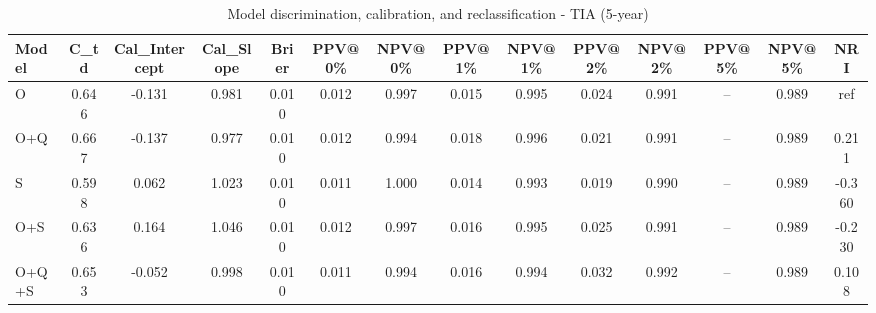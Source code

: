 \begin{table}[htbp]
\centering
\small
\caption{Model discrimination, calibration, and reclassification - TIA (5-year)}
\label{tab:perf_tia_5y}
\begin{tabular}{lccccccccccccc}
\toprule
Model & C\_td & Cal\_Intercept & Cal\_Slope & Brier & PPV@0\% & NPV@0\% & PPV@1\% & NPV@1\% & PPV@2\% & NPV@2\% & PPV@5\% & NPV@5\% & NRI \\
\midrule
O & 0.646 & -0.131 & 0.981 & 0.010 & 0.012 & 0.997 & 0.015 & 0.995 & 0.024 & 0.991 & -- & 0.989 & ref \\
O+Q & 0.667 & -0.137 & 0.977 & 0.010 & 0.012 & 0.994 & 0.018 & 0.996 & 0.021 & 0.991 & -- & 0.989 & 0.211 \\
S & 0.598 & 0.062 & 1.023 & 0.010 & 0.011 & 1.000 & 0.014 & 0.993 & 0.019 & 0.990 & -- & 0.989 & -0.360 \\
O+S & 0.636 & 0.164 & 1.046 & 0.010 & 0.012 & 0.997 & 0.016 & 0.995 & 0.025 & 0.991 & -- & 0.989 & -0.230 \\
O+Q+S & 0.653 & -0.052 & 0.998 & 0.010 & 0.011 & 0.994 & 0.016 & 0.994 & 0.032 & 0.992 & -- & 0.989 & 0.108 \\
\bottomrule
\end{tabular}
\end{table}
